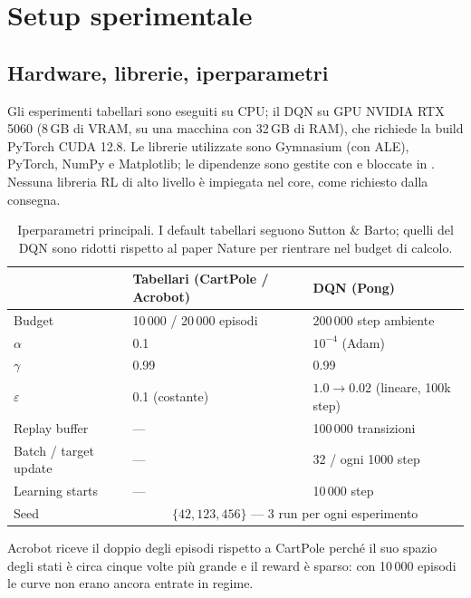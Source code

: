 \section{Setup sperimentale}
\label{sec:experiments}

\subsection{Hardware, librerie, iperparametri}
Gli esperimenti tabellari sono eseguiti su CPU; il DQN su GPU NVIDIA RTX 5060 (8\,GB di
VRAM, su una macchina con 32\,GB di RAM), che richiede la build PyTorch CUDA 12.8.
Le librerie utilizzate sono Gymnasium (con ALE), PyTorch, NumPy e Matplotlib; le
dipendenze sono gestite con  e bloccate in . Nessuna libreria RL
di alto livello \`e impiegata nel core, come richiesto dalla consegna.

\begin{table}[H]
\centering
\caption{Iperparametri principali. I default tabellari seguono Sutton \& Barto; quelli
del DQN sono ridotti rispetto al paper Nature per rientrare nel budget di calcolo.}
\label{tab:hyper}
\begin{tabular}{lll}
\toprule
 & Tabellari (CartPole / Acrobot) & DQN (Pong) \\
\midrule
Budget          & 10\,000 / 20\,000 episodi & 200\,000 step ambiente \\
$\alpha$        & 0.1                       & $10^{-4}$ (Adam) \\
$\gamma$        & 0.99                      & 0.99 \\
$\varepsilon$   & 0.1 (costante)            & $1.0 \to 0.02$ (lineare, 100k step) \\
Replay buffer   & ---                       & 100\,000 transizioni \\
Batch / target update & ---                 & 32 / ogni 1000 step \\
Learning starts & ---                       & 10\,000 step \\
Seed            & \multicolumn{2}{c}{$\{42, 123, 456\}$ --- 3 run per ogni esperimento} \\
\bottomrule
\end{tabular}
\end{table}

Acrobot riceve il doppio degli episodi rispetto a CartPole perch\'e il suo spazio degli
stati \`e circa cinque volte pi\`u grande e il reward \`e sparso: con 10\,000 episodi le
curve non erano ancora entrate in regime.

